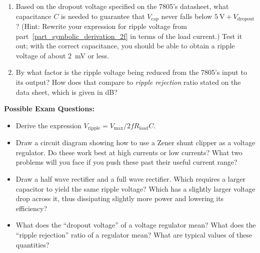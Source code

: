 \begin{enumerate}[wide]
\item Based on the dropout voltage specified on the 7805's datasheet, what capacitance $C$ is needed to guarantee that $V_\text{cap}$ never falls below $5~\text{V} + V_\text{dropout}$? (Hint: Rewrite your expression for ripple voltage from part~\ref{part_symbolic_derivation_2f} in terms of the load current.)  Test it out; with the correct capacitance, you should be able to obtain a ripple voltage of about 2~mV or less. 


\item   By what factor is the ripple voltage being reduced from the 7805's input to its output?  How does that compare to \textit{ripple rejection} ratio stated on the data sheet, which is given in dB? 
\end{enumerate}
\vfill

\textbf{Possible Exam Questions:}

\begin{itemize}

\item Derive the expression $V_\text{ripple}=V_\text{max}/2fR_\text{load} C$.

\item Draw a circuit diagram showing how to use a Zener shunt clipper as a voltage regulator.  Do these work best at high currents or low currents?  What two problems will you face if you push these past their useful current range?

\item Draw a half wave rectifier and a full wave rectifier.  Which requires a larger capacitor to yield the same ripple voltage?  Which has a slightly larger voltage drop across it, thus dissipating slightly more power and lowering its efficiency?

\item What does the ``dropout voltage'' of a voltage regulator mean?  What does the ``ripple rejection'' ratio of a regulator mean?  What are typical values of these quantities? 

\end{itemize}






